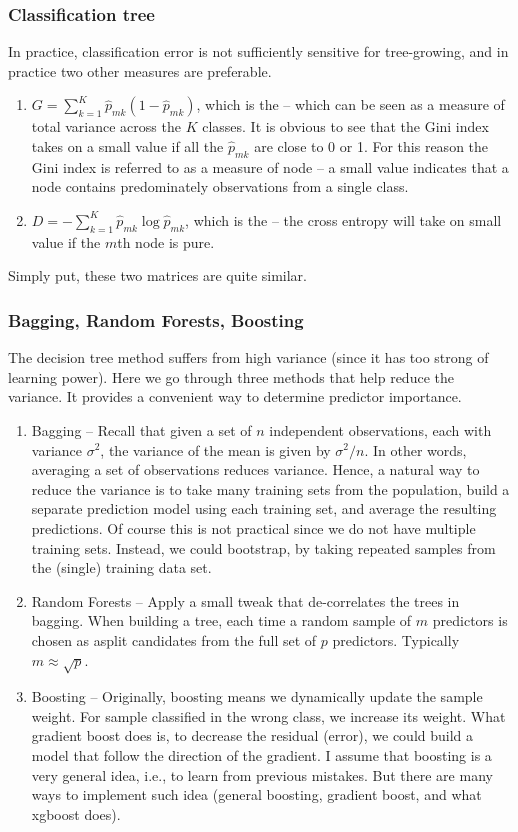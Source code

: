 \subsubsection{Classification tree}
In practice, classification error is not sufficiently sensitive for tree-growing, and in practice two other measures are preferable.
\begin{enumerate}
	\setlength{\itemsep}{0em}
	\item $G = \sum_{k=1}^{K}\hat{p}_{mk}(1- \hat{p}_{mk})$, which is the  -- which can be seen as a measure of total variance across the $K$ classes. It is obvious to see that the Gini index takes on a small value if all the $\hat{p}_{mk}$ are close to 0 or 1. For this reason the Gini index is referred to as a measure of node  -- a small value indicates that a node contains predominately observations from a single class.
	\item $D = -\sum_{k=1}^{K}\hat{p}_{mk}\log\hat{p}_{mk}$, which is the  -- the cross entropy will take on small value if the $m$th node is pure. 
\end{enumerate}
Simply put, these two matrices are quite similar. 
\subsubsection{Bagging, Random Forests, Boosting}
The decision tree method suffers from high variance (since it has too strong of learning power). Here we go through three methods that help reduce the variance. It provides a convenient way to determine predictor importance.
\begin{enumerate}
	\setlength{\itemsep}{0em}
	\item Bagging -- Recall that given a set of $n$ independent observations, each with variance $\sigma^2$, the variance of the mean is given by $\sigma^2/n$. In other words, averaging a set of observations reduces variance. Hence, a natural way to reduce the variance is  to take many training sets from the population, build a separate prediction model using each training set, and average the resulting predictions. Of course this is not practical since we do not have multiple training sets. Instead, we could bootstrap, by taking repeated samples from the (single) training data set.
	\item Random Forests -- Apply a small tweak that de-correlates the trees in bagging. When building a tree, each time a random sample of $m$ predictors is chosen as asplit candidates from the full set of $p$ predictors. Typically $m \approx \sqrt{p}$.
	\item Boosting -- Originally, boosting means we dynamically update the sample weight. For sample classified in the wrong class, we increase its weight. What gradient boost does is, to decrease the residual (error), we could build a model that follow the direction of the gradient. I assume that boosting is a very general idea, i.e., to learn from previous mistakes. But there are many ways to implement such idea (general boosting, gradient boost, and what xgboost does).
\end{enumerate}
